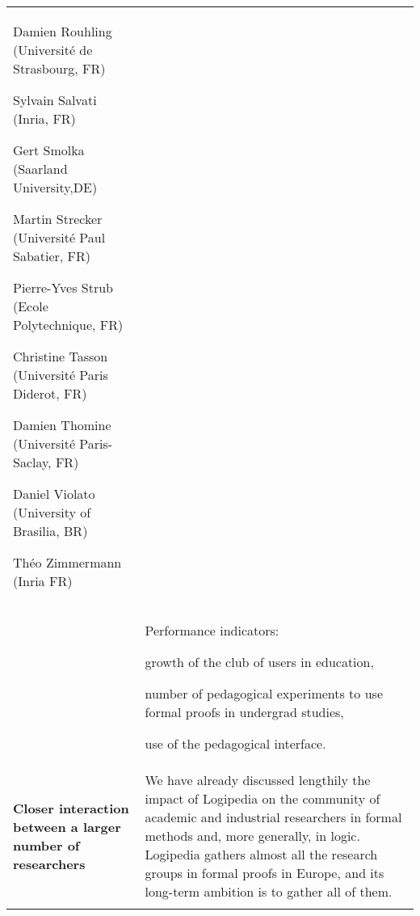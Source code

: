 \begin{longtable}{|p{}|p{}|}
\begin{framed}
\begin{compactitem}
\item Damien Rouhling (Université de Strasbourg, FR)
\item Sylvain Salvati (Inria, FR)
\item Gert Smolka (Saarland University,DE)
\item Martin Strecker (Université Paul Sabatier, FR)
\item Pierre-Yves Strub (Ecole Polytechnique, FR)
\item Christine Tasson (Université Paris Diderot, FR)
\item Damien Thomine (Université Paris-Saclay, FR)
\item Daniel Violato (University of Brasilia, BR)
\item Théo Zimmermann (Inria FR)
\end{compactitem}
\end{framed}
\\
&
\begin{framed}
Performance indicators:
\begin{compactitem}
\item growth of the club of users in education, 
\item number of pedagogical experiments to use formal proofs in 
undergrad studies, 
\item use of the pedagogical interface.
\end{compactitem}
\end{framed}
\\

\hline
{\bf Closer interaction between a larger number of researchers}
&
We have already discussed lengthily the impact of Logipedia on the
community of academic and industrial researchers in formal methods
and, more generally, in logic. Logipedia gathers almost all the
research groups in formal proofs in Europe, and its long-term ambition
is to gather all of them.
\\
&
\hspace{0.4cm}


\end{longtable}
